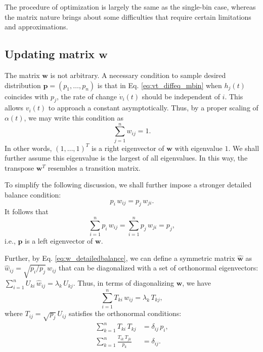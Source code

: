 \documentclass[reprint]{revtex4-1}
\begin{document}
The procedure of optimization is largely
the same as the single-bin case,
whereas the matrix nature brings about
some difficulties that require
certain limitations and approximations.



\subsection{Updating matrix $\mathbf w$}



The matrix $\mathbf w$ is not arbitrary.
%
A necessary condition to sample desired distribution
$\mathbf p = (p_1, \dots, p_n)$
is that in Eq. \eqref{eq:vt_diffeq_mbin}
when $h_j(t)$ coincides with $p_j$,
the rate of change $\dot v_i(t)$
should be independent of $i$.
%
This allows $v_i(t)$ to approach a constant
asymptotically.
%
Thus, by a proper scaling of $\alpha(t)$,
we may write this condition as
%
\begin{equation}
  \sum_{j = 1}^n w_{ij} = 1.
  \label{eq:w_sumj}
\end{equation}
%
In other words, $(1, \dots, 1)^T$
is a right eigenvector of $\mathbf w$
with eigenvalue $1$.
%
We shall further assume this eigenvalue
is the largest of all eigenvalues.
%
In this way,
the transpose $\mathbf w^T$
resembles a transition matrix.



To simplify the following discussion,
we shall further impose a stronger
detailed balance condition:
%
\begin{equation}
  p_i \, w_{ij} = p_j \, w_{ji}.
  \label{eq:w_detailedbalance}
\end{equation}
%
It follows that
\begin{equation}
  \sum_{i = 1}^n p_i \, w_{ij}
  =
  \sum_{i = 1}^n p_j \, w_{ji}
  = p_j,
  \label{eq:w_balance}
\end{equation}
i.e., $\mathbf p$ is a left eigenvector of $\mathbf w$.


Further, by Eq. \eqref{eq:w_detailedbalance},
we can define a symmetric matrix $\hat{\mathbf w}$
as $\hat w_{ij} = \sqrt{p_i/p_j} \, w_{ij}$
that can be diagonalized
with a set of orthonormal eigenvectors:
%
$\sum_{i = 1}^n U_{ki} \, \hat w_{ij} = \lambda_k \, U_{kj}$.
%
Thus,
in terms of diagonalizing $\mathbf w$, we have
\begin{equation}
  \sum_{i = 1}^n T_{ki} \, w_{ij} = \lambda_k \, T_{kj},
  \label{eq:T_w}
\end{equation}
where
$T_{ij} = \sqrt{p_j} \, U_{ij}$ satisfies
the orthonormal conditions:
%
\begin{align}
\sum_{k = 1}^n T_{ki} \, T_{kj}
&= \delta_{ij} \, p_i,
\label{eq:T_orthonormal_cols}
\\
\sum_{k = 1}^n \frac{ T_{ik} \, T_{jk} }{ p_k }
&= \delta_{ij}.
\label{eq:T_orthonormal_rows}
\end{align}
\end{document}
